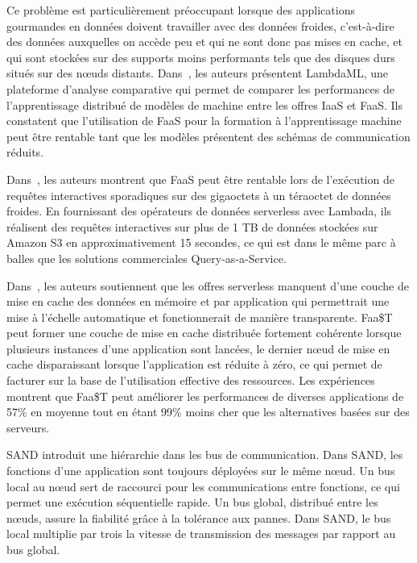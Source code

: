Ce problème est particulièrement préoccupant lorsque des applications gourmandes en données doivent travailler avec des données froides, c'est-à-dire des données auxquelles on accède peu et qui ne sont donc pas mises en cache, et qui sont stockées sur des supports moins performants tels que des disques durs situés sur des nœuds distants. Dans~\cite{Jiang2021TowardsDS}, les auteurs présentent LambdaML, une plateforme d'analyse comparative qui permet de comparer les performances de l'apprentissage distribué de modèles de machine entre les offres IaaS et FaaS. Ils constatent que l'utilisation de FaaS pour la formation à l'apprentissage machine peut être rentable tant que les modèles présentent des schémas de communication réduits.

Dans~\cite{mullerLambadaInteractiveData2020}, les auteurs montrent que FaaS peut être rentable lors de l'exécution de requêtes interactives sporadiques sur des gigaoctets à un téraoctet de données froides. En fournissant des opérateurs de données serverless avec Lambada, ils réalisent des requêtes interactives sur plus de 1 TB de données stockées sur Amazon S3 en approximativement 15 secondes, ce qui est dans le même parc à balles que les solutions commerciales Query-as-a-Service.

Dans~\cite{Romero2021FaaTAT}, les auteurs soutiennent que les offres serverless manquent d'une couche de mise en cache des données en mémoire et par application qui permettrait une mise à l'échelle automatique et fonctionnerait de manière transparente. Faa\$T peut former une couche de mise en cache distribuée fortement cohérente lorsque plusieurs instances d'une application sont lancées, le dernier nœud de mise en cache disparaissant lorsque l'application est réduite à zéro, ce qui permet de facturer sur la base de l'utilisation effective des ressources. Les expériences montrent que Faa\$T peut améliorer les performances de diverses applications de 57\% en moyenne tout en étant 99\% moins cher que les alternatives basées sur des serveurs.

SAND\cite{akkusSANDHighPerformanceServerless} introduit une hiérarchie dans les bus de communication. Dans SAND, les fonctions d'une application sont toujours déployées sur le même nœud. Un bus local au nœud sert de raccourci pour les communications entre fonctions, ce qui permet une exécution séquentielle rapide. Un bus global, distribué entre les nœuds, assure la fiabilité grâce à la tolérance aux pannes. Dans SAND, le bus local multiplie par trois la vitesse de transmission des messages par rapport au bus global.
\\


